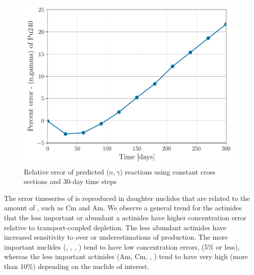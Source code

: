    \begin{figure}[htpb]
        \centering
        \includegraphics[width=\linewidth]{figs/pu240-n-gamma-months.pdf}
        \caption{Relative error of predicted  ($n,\gamma$)
            reactions using constant cross sections and 30-day time steps}
        \label{fig:pu240-n-gamma-months}
    \end{figure}

    The error timeseries of  is reproduced in daughter nuclides
    that are related to the amount of , such as Cm and Am. We
    observe a general trend for the actinides that the less important or
    abundant a actinides have higher concentration error relative to
    transport-coupled depletion. The less abundant actinides have increased
    sensitivity to over or underestimations of production.  The more important
    nuclides (, , , ) tend to have
    low concentration errors, (5\% or less), whereas the less important
    actinides (Am, Cm, , ) tend to have very high
    (more than 10\%) depending on the nuclide of interest.

